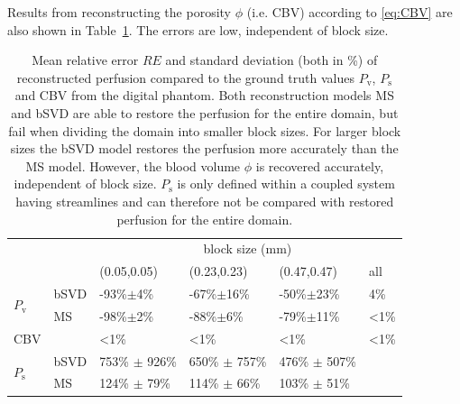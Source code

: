 \documentclass[journal,twocolumn]{IEEEtran}
\newcommand{\Perfv}{P_{\mathrm{v}}}
\newcommand{\Perfs}{P_{\mathrm{s}}}
\begin{document}
	Results from reconstructing the porosity $\phi$ (i.e. CBV) according to \eqref{eq:CBV} are also shown in Table~\ref{tab:resultsSim}. The errors are low, independent of block size.
	
	\begin{table}[h!tb]
		\scriptsize
		\caption{Mean relative error $RE$ and standard deviation (both in \%) of reconstructed perfusion compared to the ground truth values $\Perfv$, $\Perfs$ and CBV from the digital phantom. Both reconstruction models MS and bSVD are able to restore the perfusion for the entire domain, but fail when dividing the domain into smaller block sizes. For larger block sizes the bSVD model restores the perfusion more accurately than the MS model. However, the blood volume $\phi$ is recovered accurately, independent of block size. $\Perfs$ is only defined within a coupled system having streamlines and can therefore not be compared with restored perfusion for the entire domain.
		} 
		\centering
		\begin{tabular}{p{.3cm} l l l l l}
			& & \multicolumn{4}{c}{block size (\si{\mm})} \\
										& 		& (0.05,0.05) 		& (0.23,0.23) 	& 	(0.47,0.47)			& all \\ \toprule
			\multirow{2}{*}{$\Perfv$}	& bSVD 	& -93\%$\pm$4\% 	& -67\%$\pm$16\%	& -50\%$\pm$23\%	& 4\% 	\\ 
									   	& MS 	& -98\%$\pm$2\% 	& -88\%$\pm$6\%		& -79\%$\pm$11\%	& <1\% 	\\ \midrule
									CBV & 		& <1\% 				& <1\% 				& <1\% 				& <1\% 	\\ \midrule
			\multirow{2}{*}{$\Perfs$}	& bSVD	& 753\% $\pm$ 926\%	& 650\% $\pm$ 757\%	& 476\% $\pm$ 507\% & 		\\
										& MS 	& 124\% $\pm$ 79\%  & 114\% $\pm$ 66\%	& 103\% $\pm$ 51\% 	& 		\\
		\end{tabular}
		
		\label{tab:resultsSim}
	\end{table}
	
\end{document}
